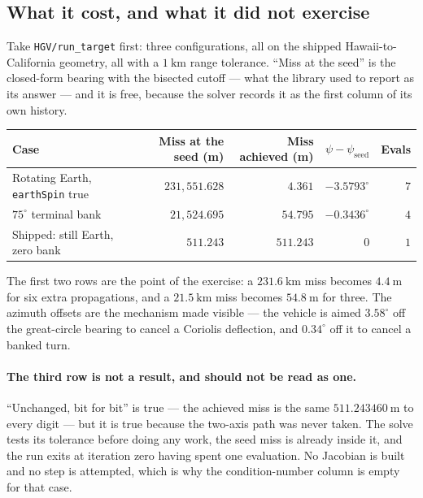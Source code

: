 \documentclass[11pt]{article}
\newcommand{\code}[1]{\texttt{#1}}
\begin{document}
\subsection{What it cost, and what it did not exercise}
\label{sec:aimmeasured}

Take \code{HGV/run\_target} first: three configurations, all on the shipped
Hawaii-to-California geometry, all
with a $1~\mathrm{km}$ range tolerance. ``Miss at the seed'' is the closed-form
bearing with the bisected cutoff --- what the library used to report as its
answer --- and it is free, because the solver records it as the first column of
its own history.

\begin{center}\small
\begin{tabular}{@{}lrrrr@{}}
\toprule
Case & Miss at the seed (m) & Miss achieved (m) & $\psi-\psi_{\text{seed}}$ & Evals \\
\midrule
Rotating Earth, \code{earthSpin} true & $231{,}551.628$ & $4.361$   & $-3.5793^{\circ}$ & $7$ \\
$75^{\circ}$ terminal bank            & $21{,}524.695$  & $54.795$  & $-0.3436^{\circ}$ & $4$ \\
Shipped: still Earth, zero bank       & $511.243$       & $511.243$ & $0$               & $1$ \\
\bottomrule
\end{tabular}
\end{center}

The first two rows are the point of the exercise: a $231.6~\mathrm{km}$ miss
becomes $4.4~\mathrm{m}$ for six extra propagations, and a $21.5~\mathrm{km}$
miss becomes $54.8~\mathrm{m}$ for three. The azimuth offsets are the
mechanism made visible --- the vehicle is aimed $3.58^{\circ}$ off the
great-circle bearing to cancel a Coriolis deflection, and $0.34^{\circ}$ off it
to cancel a banked turn.

\paragraph{The third row is not a result, and should not be read as one.}
``Unchanged, bit for bit'' is true --- the achieved miss is the same
$511.243460~\mathrm{m}$ to every digit --- but it is true because the two-axis
path was never taken. The solve tests its tolerance before doing any work, the
seed miss is already inside it, and the run exits at iteration zero having spent
one evaluation. No Jacobian is built and no step is attempted, which is why the
condition-number column is empty for that case.
\end{document}
